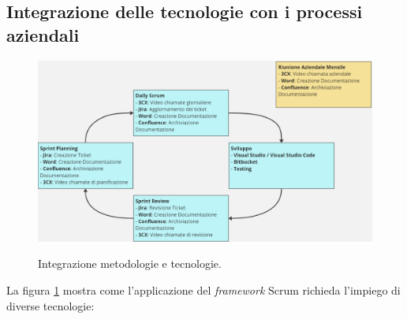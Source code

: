 \subsection{Integrazione delle tecnologie con i processi aziendali}
\begin{figure}[H]
      \centering
      \includegraphics[alt={metodologie e tecnologie}, width=\textwidth]{img/integrazione metodologie strumenti.png}
      \caption[Integrazione metodologie e tecnologie]
              {Integrazione metodologie e tecnologie.}
      \label{fig:integrazione tecnologie e metodologie}
  \end{figure}
La figura \ref{fig:integrazione tecnologie e metodologie} mostra come l'applicazione del \textit{framework} Scrum richieda 
l'impiego di diverse tecnologie:
